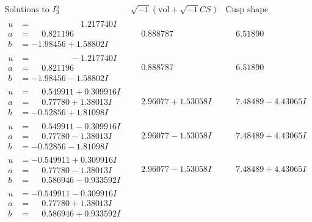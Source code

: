 \documentclass[1p]{elsarticle_modified}
\theoremstyle{definition}
\newcommand{\I}{\sqrt{-1}}
\begin{document}
$$\begin{array}{c|c|c}  
\text{Solutions to }I^u_{3}& \I (\text{vol} + \sqrt{-1}CS) & \text{Cusp shape}\\
 \hline 
\begin{aligned}
u &= \phantom{-0.000000 -}1.217740 I \\
a &= \phantom{-}0.821196\phantom{ +0.000000I} \\
b &= -1.98456 + 1.58802 I\end{aligned}
 & \phantom{-}0.888787\phantom{ +0.000000I} & \phantom{-}6.51890\phantom{ +0.000000I} \\ \hline\begin{aligned}
u &= \phantom{-0.000000 } -1.217740 I \\
a &= \phantom{-}0.821196\phantom{ +0.000000I} \\
b &= -1.98456 - 1.58802 I\end{aligned}
 & \phantom{-}0.888787\phantom{ +0.000000I} & \phantom{-}6.51890\phantom{ +0.000000I} \\ \hline\begin{aligned}
u &= \phantom{-}0.549911 + 0.309916 I \\
a &= \phantom{-}0.77780 + 1.38013 I \\
b &= -0.52856 + 1.81098 I\end{aligned}
 & \phantom{-}2.96077 + 1.53058 I & \phantom{-}7.48489 - 4.43065 I \\ \hline\begin{aligned}
u &= \phantom{-}0.549911 - 0.309916 I \\
a &= \phantom{-}0.77780 - 1.38013 I \\
b &= -0.52856 - 1.81098 I\end{aligned}
 & \phantom{-}2.96077 - 1.53058 I & \phantom{-}7.48489 + 4.43065 I \\ \hline\begin{aligned}
u &= -0.549911 + 0.309916 I \\
a &= \phantom{-}0.77780 - 1.38013 I \\
b &= \phantom{-}0.586946 - 0.933592 I\end{aligned}
 & \phantom{-}2.96077 - 1.53058 I & \phantom{-}7.48489 + 4.43065 I \\ \hline\begin{aligned}
u &= -0.549911 - 0.309916 I \\
a &= \phantom{-}0.77780 + 1.38013 I \\
b &= \phantom{-}0.586946 + 0.933592 I\end{aligned}

\end{array}$$
\end{document}
